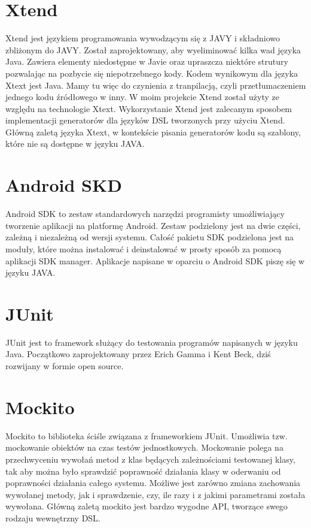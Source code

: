 \documentclass	{xmgr}
\begin{document}
\section{Xtend}

Xtend \cite{Xtend:2017:Doc} jest językiem programowania wywodzącym się z JAVY i składniowo zbliżonym do JAVY. Został zaprojektowany, aby wyeliminować kilka wad języka Java. Zawiera elementy niedostępne w Javie oraz upraszcza niektóre strutury pozwalając na pozbycie się niepotrzebnego kody. Kodem wynikowym dla języka Xtext jest Java. Mamy tu więc do czynienia z tranpilacją, czyli przetłumaczeniem jednego kodu źródłowego w inny.
W moim projekcie Xtend został użyty ze względu na technologie Xtext. Wykorzystanie Xtend jest zalecanym sposobem implementacji generatorów dla języków DSL tworzonych przy użyciu Xtend. Główną zaletą języka Xtext, w kontekście pisania generatorów kodu są szablony, które nie są dostępne w języku JAVA.

\section{Android SKD}

Android SDK \cite{AndroidSDK:2017:Doc} to zestaw standardowych narzędzi programisty umożliwiający tworzenie aplikacji na platformę Android. Zestaw podzielony jest na dwie części, zależną i niezależną od wersji systemu. Całość pakietu SDK podzielona jest na moduły, które można instalować i deinstalować w prosty sposób za pomocą aplikacji SDK manager. Aplikacje napisane w oparciu o Android SDK piszę się w języku JAVA.

\section{JUnit}

JUnit \cite{JUnit:2017:Doc} jest to framework służący do testowania programów napisanych w języku Java. Początkowo zaprojektowany przez Erich Gamma i Kent Beck, dziś rozwijany w formie open source.

\section{Mockito}

Mockito \cite{Mockito:2017:Doc} to biblioteka ściśle związana z frameworkiem JUnit. Umożliwia tzw. mockowanie obiektów na czas testów jednostkowych. Mockowanie polega na przechwyceniu wywołań metod z klas będących zależnościami testowanej klasy, tak aby można było sprawdzić poprawność działania klasy w oderwaniu od poprawności działania całego systemu. Możliwe jest zarówno zmiana zachowania wywołanej metody, jak i sprawdzenie, czy, ile razy i z jakimi parametrami została wywołana. Główną zaletą mockito jest bardzo wygodne API, tworzące swego rodzaju wewnętrzny DSL.
 
\end{document}
